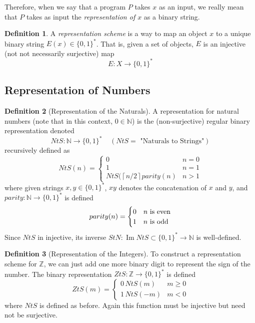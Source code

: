 \documentclass[a4paper, 12pt]{report}
\DeclareMathOperator{\im}{Im}
\theoremstyle{remark}
\theoremstyle{definition}
\newtheorem{definition}{Definition}[section]
\begin{document}
Therefore, when we say that a program $P$ takes $x$ as an input, we really mean that $P$ takes as input the \textit{representation of $x$} as a binary string.  

\begin{definition}
A \textit{representation scheme} is a way to map an object $x$ to a unique binary string $E(x) \in \{0,1\}^*$. That is, given a set of objects, $E$ is an injective (not not necessarily surjective) map
\[E: X \longrightarrow \{0,1\}^*\]
\end{definition}

\subsection{Representation of Numbers}
\begin{definition}[Representation of the Naturals]
A representation for natural numbers (note that in this context, $0 \in \mathbb{N}$) is the (non-surjective) regular binary representation denoted
\[NtS: \mathbb{N} \longrightarrow \{0,1\}^* \;\;\;\; (NtS= \text{ "Naturals to Strings"})\]
recursively defined as 
\[NtS(n) = \begin{cases}
0 & n = 0 \\
1 & n = 1 \\
NtS(\left \lceil{n/2}\right \rceil parity(n) & n > 1 
\end{cases}\]
where given strings $x, y \in \{0,1\}^*$, $xy$ denotes the concatenation of $x$ and $y$, and $parity: \mathbb{N} \longrightarrow \{0,1\}^*$ is defined 
\[parity(n) = \begin{cases}
0 & n $\text{ is even}$ \\
1 & n $\text{ is odd}$
\end{cases}\]
Since $NtS$ in injective, its inverse $StN: \im{NtS} \subset \{0,1\}^* \longrightarrow \mathbb{N}$ is well-defined. 
\end{definition}

\begin{definition}[Representation of the Integers]
To construct a representation scheme for $\mathbb{Z}$, we can just add one more binary digit to represent the sign of the number. The binary representation $ZtS: \mathbb{Z} \longrightarrow \{0, 1\}^*$ is defined
\[ZtS(m) = \begin{cases}
0\, NtS(m) & m \geq 0 \\
1 \, NtS(-m) & m < 0
\end{cases}\]
where $NtS$ is defined as before. Again this function must be injective but need not be surjective. 
\end{definition}
\end{document}
